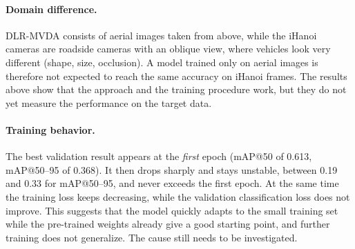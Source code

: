 \documentclass[12pt,a4paper]{article}
\begin{document}
\paragraph{Domain difference.}
DLR-MVDA consists of aerial images taken from above, while the iHanoi cameras
are roadside cameras with an oblique view, where vehicles look very different
(shape, size, occlusion). A model trained only on aerial images is therefore
not expected to reach the same accuracy on iHanoi frames. The results above
show that the approach and the training procedure work, but they do not yet
measure the performance on the target data.

\paragraph{Training behavior.}
The best validation result appears at the \emph{first} epoch (mAP@50 of 0.613,
mAP@50--95 of 0.368). It then drops sharply and stays unstable, between 0.19 and
0.33 for mAP@50--95, and never exceeds the first epoch. At the same time the
training loss keeps decreasing, while the validation classification loss does
not improve. This suggests that the model quickly adapts to the small training
set while the pre-trained weights already give a good starting point, and
further training does not generalize. The cause still needs to be investigated.
\end{document}
